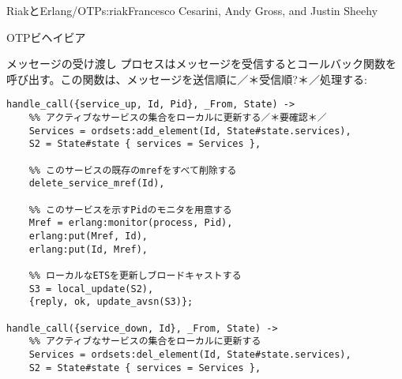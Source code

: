 \begin{aosachapter}{RiakとErlang/OTP}{s:riak}{Francesco Cesarini, Andy Gross, and Justin Sheehy}
\begin{aosasect1}{OTPビヘイビア}
\begin{aosasect2}{メッセージの受け渡し}
\noindent {}プロセスはメッセージを受信するとコールバック関数を呼び出す。この関数は、メッセージを送信順に／＊受信順?＊／処理する:








\begin{verbatim}
handle_call({service_up, Id, Pid}, _From, State) ->
    %% アクティブなサービスの集合をローカルに更新する／＊要確認＊／
    Services = ordsets:add_element(Id, State#state.services),
    S2 = State#state { services = Services },

    %% このサービスの既存のmrefをすべて削除する
    delete_service_mref(Id),

    %% このサービスを示すPidのモニタを用意する
    Mref = erlang:monitor(process, Pid),
    erlang:put(Mref, Id),
    erlang:put(Id, Mref),

    %% ローカルなETSを更新しブロードキャストする
    S3 = local_update(S2),
    {reply, ok, update_avsn(S3)};

handle_call({service_down, Id}, _From, State) ->
    %% アクティブなサービスの集合をローカルに更新する
    Services = ordsets:del_element(Id, State#state.services),
    S2 = State#state { services = Services },


\end{verbatim}
\end{aosasect2}
\end{aosasect1}
\end{aosachapter}
